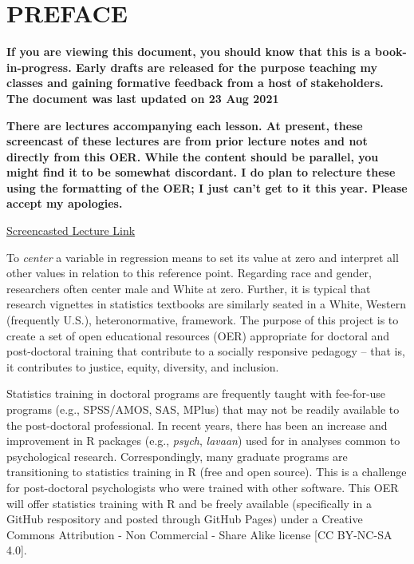 \documentclass[
  english,
]{book}
\begin{document}
\hypertarget{preface}{%
\chapter*{PREFACE}\label{preface}}

\textbf{If you are viewing this document, you should know that this is a book-in-progress. Early drafts are released for the purpose teaching my classes and gaining formative feedback from a host of stakeholders. The document was last updated on 23 Aug 2021}

\textbf{There are lectures accompanying each lesson. At present, these screencast of these lectures are from prior lecture notes and not directly from this OER. While the content should be parallel, you might find it to be somewhat discordant. I do plan to relecture these using the formatting of the OER; I just can't get to it this year. Please accept my apologies.}

\href{https://spu.hosted.panopto.com/Panopto/Pages/Viewer.aspx?id=c932455e-ef06-444a-bdca-acf7012d759a}{Screencasted Lecture Link}

To \emph{center} a variable in regression means to set its value at zero and interpret all other values in relation to this reference point. Regarding race and gender, researchers often center male and White at zero. Further, it is typical that research vignettes in statistics textbooks are similarly seated in a White, Western (frequently U.S.), heteronormative, framework. The purpose of this project is to create a set of open educational resources (OER) appropriate for doctoral and post-doctoral training that contribute to a socially responsive pedagogy -- that is, it contributes to justice, equity, diversity, and inclusion.

Statistics training in doctoral programs are frequently taught with fee-for-use programs (e.g., SPSS/AMOS, SAS, MPlus) that may not be readily available to the post-doctoral professional. In recent years, there has been an increase and improvement in R packages (e.g., \emph{psych}, \emph{lavaan}) used for in analyses common to psychological research. Correspondingly, many graduate programs are transitioning to statistics training in R (free and open source). This is a challenge for post-doctoral psychologists who were trained with other software. This OER will offer statistics training with R and be freely available (specifically in a GitHub respository and posted through GitHub Pages) under a Creative Commons Attribution - Non Commercial - Share Alike license {[}CC BY-NC-SA 4.0{]}.
\end{document}
